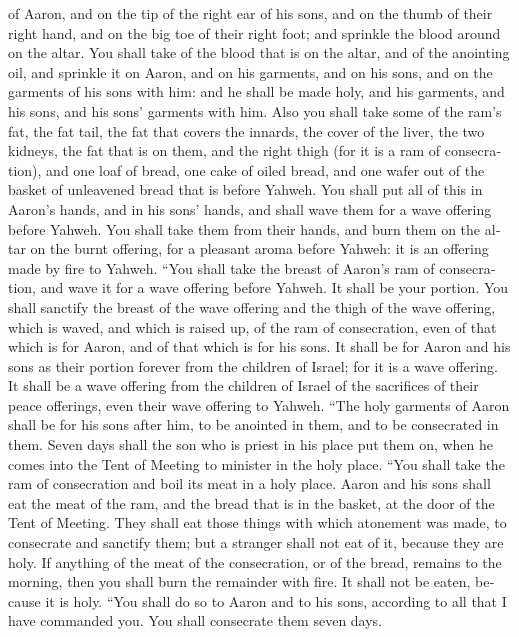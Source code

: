 \begin{paracol}{2}
\begin{otherlanguage}{english}
of Aaron, and on the tip of the right ear of his sons, and on the thumb
of their right hand, and on the big toe of their right foot; and
sprinkle the blood around on the altar.  You shall take
of the blood that is on the altar, and of the anointing oil, and
sprinkle it on Aaron, and on his garments, and on his sons, and on the
garments of his sons with him: and he shall be made holy, and his
garments, and his sons, and his sons' garments with him. 
Also you shall take some of the ram's fat, the fat tail, the fat that
covers the innards, the cover of the liver, the two kidneys, the fat
that is on them, and the right thigh (for it is a ram of consecration),
 and one loaf of bread, one cake of oiled bread, and one
wafer out of the basket of unleavened bread that is before Yahweh.
 You shall put all of this in Aaron's hands, and in his
sons' hands, and shall wave them for a wave offering before Yahweh.
 You shall take them from their hands, and burn them on
the altar on the burnt offering, for a pleasant aroma before Yahweh: it
is an offering made by fire to Yahweh.  ``You shall take
the breast of Aaron's ram of consecration, and wave it for a wave
offering before Yahweh. It shall be your portion.  You
shall sanctify the breast of the wave offering and the thigh of the wave
offering, which is waved, and which is raised up, of the ram of
consecration, even of that which is for Aaron, and of that which is for
his sons.  It shall be for Aaron and his sons as their
portion forever from the children of Israel; for it is a wave offering.
It shall be a wave offering from the children of Israel of the
sacrifices of their peace offerings, even their wave offering to Yahweh.
 ``The holy garments of Aaron shall be for his sons after
him, to be anointed in them, and to be consecrated in them.
 Seven days shall the son who is priest in his place put
them on, when he comes into the Tent of Meeting to minister in the holy
place.  ``You shall take the ram of consecration and boil
its meat in a holy place.  Aaron and his sons shall eat
the meat of the ram, and the bread that is in the basket, at the door of
the Tent of Meeting.  They shall eat those things with
which atonement was made, to consecrate and sanctify them; but a
stranger shall not eat of it, because they are holy.  If
anything of the meat of the consecration, or of the bread, remains to
the morning, then you shall burn the remainder with fire. It shall not
be eaten, because it is holy.  ``You shall do so to Aaron
and to his sons, according to all that I have commanded you. You shall
consecrate them seven days.


\end{otherlanguage}
\end{paracol}
